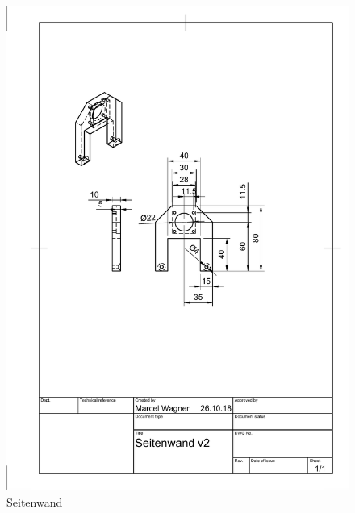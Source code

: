 \begin{figure}
	\centering
	\includegraphics[width=\textwidth]{images/Mechanik/Seitenwand}
	\caption{Seitenwand}
\end{figure}

